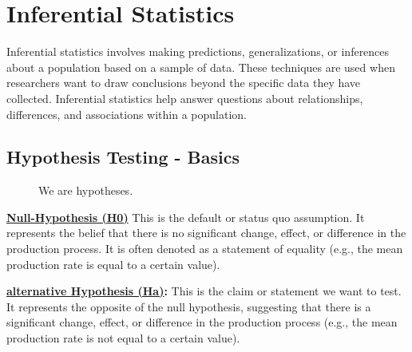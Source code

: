 \documentclass[
  a4paper,
]{scrbook}
\begin{document}

\chapter{Inferential Statistics}\label{inferential-statistics}

Inferential statistics involves making predictions, generalizations, or
inferences about a population based on a sample of data. These
techniques are used when researchers want to draw conclusions beyond the
specific data they have collected. Inferential statistics help answer
questions about relationships, differences, and associations within a
population.

\section{Hypothesis Testing - Basics}\label{hypothesis-testing---basics}

\begin{figure}[ht]


\caption{\label{fig-hypothesis}We are hypotheses.}

\end{figure}%

\textbf{\hyperref[acronyms_H0]{Null-Hypothesis (H0)}} This is the
default or status quo assumption. It represents the belief that there is
no significant change, effect, or difference in the production process.
It is often denoted as a statement of equality (e.g., the mean
production rate is equal to a certain value).

\textbf{\hyperref[acronyms_Ha]{alternative Hypothesis (Ha)}:} This is
the claim or statement we want to test. It represents the opposite of
the null hypothesis, suggesting that there is a significant change,
effect, or difference in the production process (e.g., the mean
production rate is not equal to a certain value).
\end{document}
